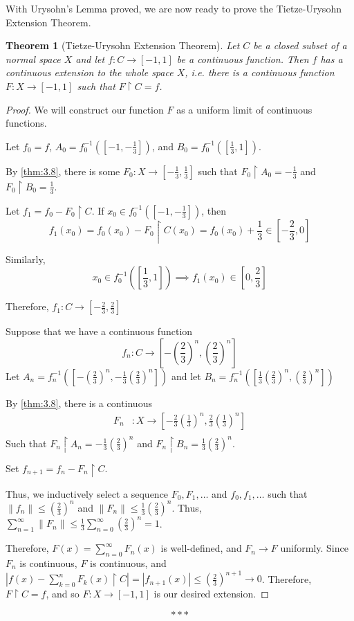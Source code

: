 \documentclass[openany, amssymb, psamsfonts]{amsart}
\let\fullref\autoref
\newtheorem{thm}{Theorem}[section]
\theoremstyle{definition}
\numberwithin{equation}{section}
\begin{document}
With Urysohn's Lemma proved, we are now ready to prove the Tietze-Urysohn Extension Theorem.
\begin{thm}[Tietze-Urysohn Extension Theorem]\label{thm:3.9}
  Let $C$ be a closed subset of a normal space $X$ and let $f: C \to [-1,1]$ be a continuous function. Then $f$ has a continuous extension to the whole space $X$, i.e. there is a continuous function $F:X\to [-1,1]$ such that $F \restriction C = f$. 
\end{thm}
\begin{proof}
  We will construct our function $F$ as a uniform limit of continuous functions. 

  Let $f_0 = f$, $A_0 = f_0^{-1}([-1, -\frac13])$, and $B_0 = f_0^{-1}([\frac13, 1])$. 

  By \fullref{thm:3.8}, there is some $F_0: X \to [-\frac13, \frac13]$ such that $F_0 \restriction A_0 = -\frac13$ and $F_0 \restriction B_0 = \frac13$. 

  Let $f_1 = f_0 - F_0\restriction C$. If $x_0 \in f_0^{-1}\left(\left[-1, -\frac13\right]\right)$, then 
  $$f_1(x_0) = f_0(x_0) - F_0\restriction C (x_0) = f_0(x_0) + \frac13 \in \left[-\frac23, 0\right]$$ 

  Similarly, 
  \[
    x_0 \in f_0^{-1}\left(\left[\frac13, 1\right]\right) \implies f_1(x_0) \in \left[0, \frac23\right]
  \]

  Therefore, $f_1:C\to[-\frac23, \frac23]$

  Suppose that we have a continuous function 
  \[
    f_n : C \to \left[-\left(\frac23\right)^n, \left(\frac23\right)^n \right]
  \]
  Let $A_n = f_n^{-1} ([-(\frac23)^n, -\frac13(\frac23)^n])$ and let $B_n = f_n^{-1}([\frac13(\frac23)^n, (\frac23)^n])$

  By \fullref{thm:3.8}, there is a continuous
  \begin{align*}
    F_n&:X \to \left[-\frac23 \left(\frac13\right)^n, \frac23 \left(\frac13\right)^n\right]\\
  \end{align*}
  Such that $F_n \restriction A_n = -\frac13(\frac23)^n$ and $F_n\restriction B_n = \frac13(\frac23)^n$.
  
  Set $f_{n+1} = f_n - F_n\restriction C$.

  Thus, we inductively select a sequence $F_0, F_1, \ldots$ and $f_0, f_1, \ldots$ such that $\|f_n\| \le (\frac23)^n$ and $\|F_n\| \le \frac13 \left(\frac23\right)^n$. Thus, $\sum_{n=1}^\infty \|F_n\| \le \frac13 \sum_{n=0}^\infty \left(\frac23\right)^n = 1$. 

  Therefore, $F(x) = \sum_{n=0}^\infty F_n(x)$ is well-defined, and $F_n \to F$ uniformly. Since $F_n$ is continuous, $F$ is continuous, and $\left|f(x) - \sum_{k=0}^n F_k(x)\restriction C\right| = |f_{n+1}(x)| \le \left(\frac23\right)^{n+1}\to 0$. Therefore, $F\restriction C = f$, and so $F:X \to [-1,1]$ is our desired extension. 
\end{proof}
\[
  \ast \ast \ast
\]
\end{document}
